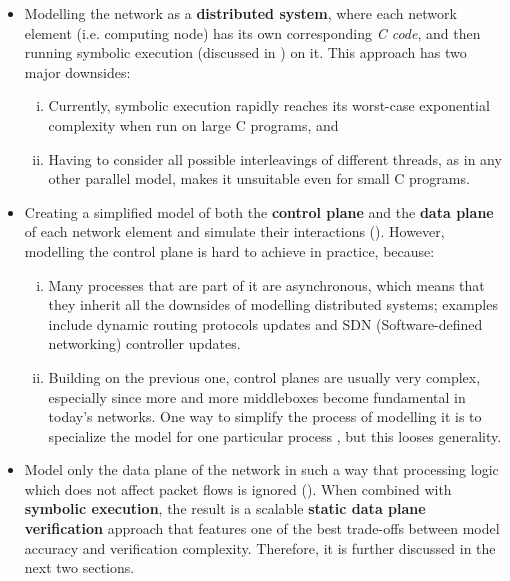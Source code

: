 \begin{itemize}
  \item Modelling the network as a \textbf{distributed system}, where each
    network element (i.e. computing node) has its own corresponding \emph{C
    code}, and then running symbolic execution (discussed in
    ) on it.  This approach has two
    major downsides:
      \begin{enumerate}[(i)]
        \item Currently, symbolic execution rapidly reaches its worst-case
          exponential complexity when run on large C programs, and
        \item Having to consider all possible interleavings of different
          threads, as in any other parallel model, makes it unsuitable even
          for small C programs.
      \end{enumerate}
  \item Creating a simplified model of both the \textbf{control plane} and the
    \textbf{data plane} of each network element and simulate their interactions
    ().  However, modelling the
    control plane is hard to achieve in practice, because:
    \begin{enumerate}[(i)]
      \item Many processes that are part of it are asynchronous, which means
        that they inherit all the downsides of modelling distributed systems;
        examples include dynamic routing protocols updates and SDN
        (Software-defined networking)
        controller updates.
      \item Building on the previous one, control planes are usually very
        complex, especially since more and more middleboxes become fundamental
        in today's networks.  One way to simplify the process of modelling it
        is to specialize the model for one particular process
        \cite{weitz2016bagpipe, fogel2015general}, but this looses generality.
    \end{enumerate}
  \item Model only the data plane of the network in such a way that processing
    logic which does not affect packet flows is ignored
    ().  When combined with
    \textbf{symbolic execution}, the result is a scalable
    \textbf{static data plane verification} approach that features one of the
    best trade-offs between model accuracy and verification complexity.
    Therefore, it is further discussed in the next two sections.
\end{itemize}


